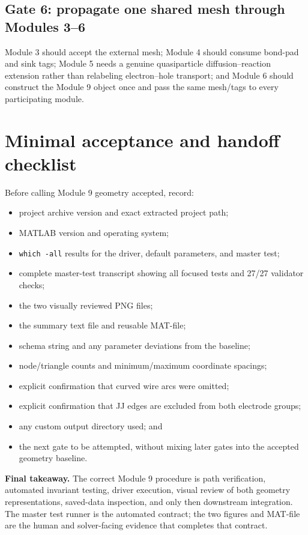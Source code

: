 \documentclass[11pt]{article}
\begin{document}
\subsection{Gate 6: propagate one shared mesh through Modules 3--6}

Module 3 should accept the external mesh; Module 4 should consume bond-pad and sink tags; Module 5 needs a genuine quasiparticle diffusion--reaction extension rather than relabeling electron--hole transport; and Module 6 should construct the Module 9 object once and pass the same mesh/tags to every participating module.

\section{Minimal acceptance and handoff checklist}

Before calling Module 9 geometry accepted, record:

\begin{itemize}[leftmargin=*]
  \item project archive version and exact extracted project path;
  \item MATLAB version and operating system;
  \item \texttt{which -all} results for the driver, default parameters, and master test;
  \item complete master-test transcript showing all focused tests and 27/27 validator checks;
  \item the two visually reviewed PNG files;
  \item the summary text file and reusable MAT-file;
  \item schema string and any parameter deviations from the baseline;
  \item node/triangle counts and minimum/maximum coordinate spacings;
  \item explicit confirmation that curved wire arcs were omitted;
  \item explicit confirmation that JJ edges are excluded from both electrode groups;
  \item any custom output directory used; and
  \item the next gate to be attempted, without mixing later gates into the accepted geometry baseline.
\end{itemize}

\begin{physicsbox}
\textbf{Final takeaway.} The correct Module 9 procedure is path verification, automated invariant testing, driver execution, visual review of both geometry representations, saved-data inspection, and only then downstream integration. The master test runner is the automated contract; the two figures and MAT-file are the human and solver-facing evidence that completes that contract.
\end{physicsbox}
\end{document}
